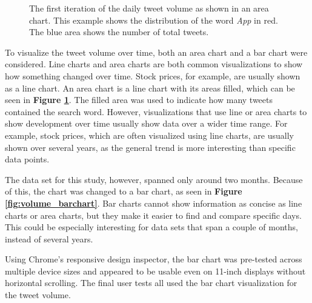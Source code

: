 \begin{figure}[h!tb]
    \caption{The first iteration of the daily tweet volume as shown in an area chart. This example shows the distribution of the word \emph{App} in red. The blue area shows the number of total tweets.}
    \label{fig:volume_areachart}
\end{figure}

To visualize the tweet volume over time, both an area chart and a bar chart were considered. Line charts and area charts are both common visualizations to show how something changed over time. Stock prices, for example, are usually shown as a line chart. An area chart is a line chart with its areas filled, which can be seen in \textbf{Figure \ref{fig:volume_areachart}}. The filled area was used to indicate how many tweets contained the search word. However, visualizations that use line or area charts to show development over time usually show data over a wider time range. For example, stock prices, which are often visualized using line charts, are usually shown over several years, as the general trend is more interesting than specific data points.

The data set for this study, however, spanned only around two months. Because of this, the chart was changed to a bar chart, as seen in \textbf{Figure \ref{fig:volume_barchart}}. Bar charts cannot show information as concise as line charts or area charts, but they make it easier to find and compare specific days. This could be especially interesting for data sets that span a couple of months, instead of several years.

Using Chrome's responsive design inspector, the bar chart was pre-tested across multiple device sizes and appeared to be usable even on 11-inch displays without horizontal scrolling. The final user tests all used the bar chart visualization for the tweet volume.

